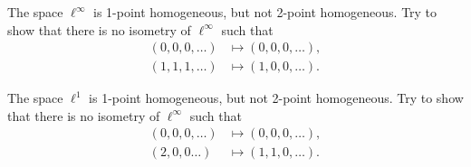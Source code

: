  The space $\ell^\infty$ is 1-point homogeneous, but not 2-point homogeneous.
Try to show that there is no isometry of $\ell^\infty$ such that
\begin{align*}
(0,0,0,\dots)&\mapsto (0,0,0,\dots),
\\
(1,1,1,\dots)&\mapsto (1,0,0,\dots).
\end{align*}

The space $\ell^1$ is 1-point homogeneous, but not 2-point homogeneous.
Try to show that there is no isometry of $\ell^\infty$ such that
\begin{align*}
(0,0,0,\dots)&\mapsto (0,0,0,\dots),
\\
(2,0,0\dots)&\mapsto (1,1,0,\dots).
\end{align*}
